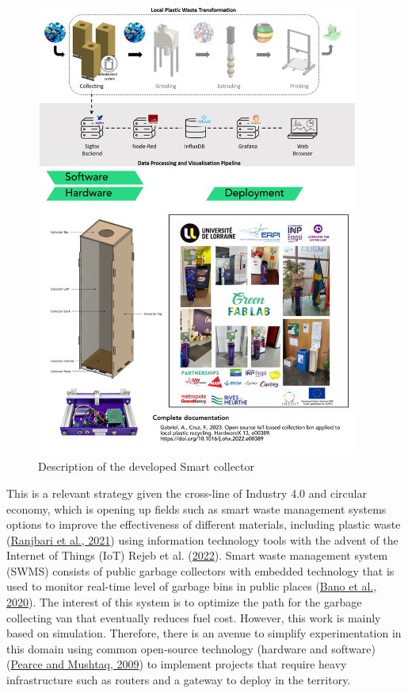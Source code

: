 \documentclass[
  11pt,
]{article}
\begin{document}
\begin{figure}[H]

{\centering \includegraphics[width=4.16667in,height=\textheight]{figures/SC/Abstract.png}

}

\caption{\label{fig-smart-collector}Description of the developed Smart
collector}

\end{figure}

This is a relevant strategy given the cross-line of Industry 4.0 and
circular economy, which is opening up fields such as smart waste
management systems options to improve the effectiveness of different
materials, including plastic waste
(\protect\hyperlink{ref-Ranjbari2021}{Ranjbari et al., 2021}) using
information technology tools with the advent of the Internet of Things
(IoT) Rejeb et al. (\protect\hyperlink{ref-rejeb2022}{2022}). Smart
waste management system (SWMS) consists of public garbage collectors
with embedded technology that is used to monitor real-time level of
garbage bins in public places (\protect\hyperlink{ref-Bano2020}{Bano et
al., 2020}). The interest of this system is to optimize the path for the
garbage collecting van that eventually reduces fuel cost. However, this
work is mainly based on simulation. Therefore, there is an avenue to
simplify experimentation in this domain using common open-source
technology (hardware and software)
(\protect\hyperlink{ref-Pearce2009}{Pearce and Mushtaq, 2009}) to
implement projects that require heavy infrastructure such as routers and
a gateway to deploy in the territory.
\end{document}
